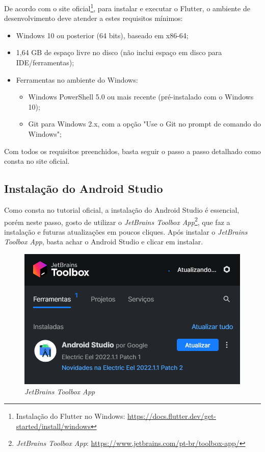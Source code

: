 De acordo com o site oficial\footnote{\label{flutter_install}Instalação do Flutter no Windows: \url{https://docs.flutter.dev/get-started/install/windows}}, para instalar e executar o Flutter, o ambiente de desenvolvimento deve atender a estes requisitos mínimos:
\begin{itemize}
   \item Windows 10 ou posterior (64 bits), baseado em x86-64;
   \item 1,64 GB de espaço livre no disco (não inclui espaço em disco para IDE/ferramentas);
   \item Ferramentas no ambiente do Windows:
   \begin{itemize}
     \item Windows PowerShell 5.0 ou mais recente (pré-instalado com o Windows 10);
     \item Git para Windows 2.x, com a opção "Use o Git no prompt de comando do Windows";
   \end{itemize}
 \end{itemize}

 Com todos os requisitos preenchidos, basta seguir o passo a passo detalhado como consta no site oficial.

\subsection{Instalação do Android Studio}\label{ssec:instalacao_android_studio}
Como consta no tutorial oficial, a instalação do Android Studio é essencial, porém neste passo, gosto de utilizar o \textit{JetBrains Toolbox App}\footnote{\label{toolbox}\textit{JetBrains Toolbox App}: \url{https://www.jetbrains.com/pt-br/toolbox-app/}}, que faz a instalação e futuras atualizações em poucos cliques. Após instalar o \textit{JetBrains Toolbox App}, basta achar o Android Studio e clicar em instalar.

\begin{figure}[H]
\centering
  \includegraphics{images/toolbox.png}
  \caption{\textit{JetBrains Toolbox App}}
  \label{fig:toolbox}
\end{figure}

